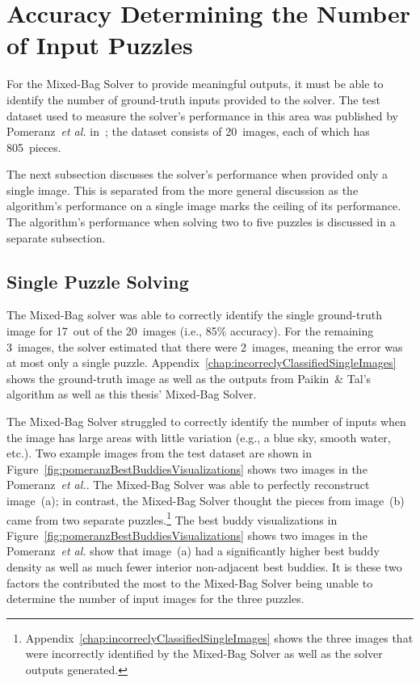 \section{Accuracy Determining the Number of Input Puzzles}

For the Mixed-Bag Solver to provide meaningful outputs, it must be able to identify the number of ground-truth inputs provided to the solver.  The test dataset used to measure the solver's performance in this area was published by Pomeranz~\textit{et al.} in~\cite{pomeranzBenchmarkImages}; the dataset consists of 20~images, each of which has 805~pieces.

The next subsection discusses the solver's performance when provided only a single image.  This is separated from the more general discussion as the algorithm's performance on a single image marks the ceiling of its performance.  The algorithm's performance when solving two to five puzzles is discussed in a separate subsection.

\subsection{Single Puzzle Solving}\label{sec:singlePuzzleSolving}

The Mixed-Bag solver was able to correctly identify the single ground-truth image for  17~out of the 20~images (i.e., 85\% accuracy).  For the remaining 3~images, the solver estimated that there were 2~images, meaning the error was at most only a single puzzle.  Appendix~\ref{chap:incorreclyClassifiedSingleImages} shows the ground-truth image as well as the outputs from Paikin~\& Tal's algorithm as well as this thesis' Mixed-Bag Solver.  

The Mixed-Bag Solver struggled to correctly identify the number of inputs when the image has large areas with little variation (e.g., a blue sky, smooth water, etc.). Two example images from the test dataset are shown in Figure~\ref{fig:pomeranzBestBuddiesVisualizations} shows two images in the Pomeranz~\textit{et al.}.  The Mixed-Bag Solver was able to perfectly reconstruct image~(a); in contrast, the Mixed-Bag Solver thought the pieces from image~(b) came from two separate puzzles.\footnote{Appendix~\ref{chap:incorreclyClassifiedSingleImages} shows the three images that were incorrectly identified by the Mixed-Bag Solver as well as the solver outputs generated.} The best buddy visualizations in Figure~\ref{fig:pomeranzBestBuddiesVisualizations} shows two images in the Pomeranz~\textit{et al.} show that image~(a) had a significantly higher best buddy density as well as much fewer interior non-adjacent best buddies.  It is these two factors the contributed the most to the Mixed-Bag Solver being unable to determine the number of input images for the three puzzles. 

